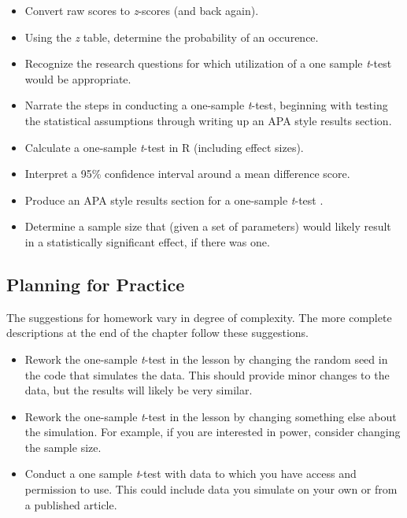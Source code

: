 \documentclass[
  11pt,
]{book}
\providecommand{\tightlist}{%
  \setlength{\itemsep}{0pt}\setlength{\parskip}{0pt}}
\begin{document}
\begin{itemize}
\tightlist
\item
  Convert raw scores to \emph{z}-scores (and back again).
\item
  Using the \emph{z} table, determine the probability of an occurence.
\item
  Recognize the research questions for which utilization of a one sample \emph{t}-test would be appropriate.
\item
  Narrate the steps in conducting a one-sample \emph{t}-test, beginning with testing the statistical assumptions through writing up an APA style results section.
\item
  Calculate a one-sample \emph{t}-test in R (including effect sizes).
\item
  Interpret a 95\% confidence interval around a mean difference score.
\item
  Produce an APA style results section for a one-sample \emph{t}-test .
\item
  Determine a sample size that (given a set of parameters) would likely result in a statistically significant effect, if there was one.
\end{itemize}

\hypertarget{planning-for-practice-1}{%
\subsection{Planning for Practice}\label{planning-for-practice-1}}

The suggestions for homework vary in degree of complexity. The more complete descriptions at the end of the chapter follow these suggestions.

\begin{itemize}
\tightlist
\item
  Rework the one-sample \emph{t}-test in the lesson by changing the random seed in the code that simulates the data. This should provide minor changes to the data, but the results will likely be very similar.
\item
  Rework the one-sample \emph{t}-test in the lesson by changing something else about the simulation. For example, if you are interested in power, consider changing the sample size.
\item
  Conduct a one sample \emph{t}-test with data to which you have access and permission to use. This could include data you simulate on your own or from a published article.
\end{itemize}
\end{document}
